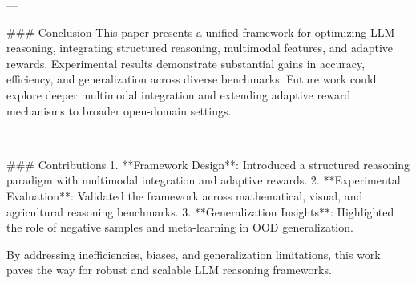 ---

### Conclusion
This paper presents a unified framework for optimizing LLM reasoning, integrating structured reasoning, multimodal features, and adaptive rewards. Experimental results demonstrate substantial gains in accuracy, efficiency, and generalization across diverse benchmarks. Future work could explore deeper multimodal integration and extending adaptive reward mechanisms to broader open-domain settings.

---

### Contributions
1. **Framework Design**: Introduced a structured reasoning paradigm with multimodal integration and adaptive rewards.
2. **Experimental Evaluation**: Validated the framework across mathematical, visual, and agricultural reasoning benchmarks.
3. **Generalization Insights**: Highlighted the role of negative samples and meta-learning in OOD generalization.

By addressing inefficiencies, biases, and generalization limitations, this work paves the way for robust and scalable LLM reasoning frameworks.